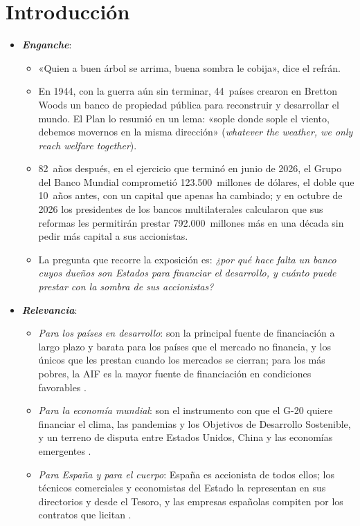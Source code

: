 \documentclass[11pt]{article}
\begin{document}
\tceetitulo

\section*{Introducción}

\begin{itemize}
\item \textbf{\emph{Enganche}}:
  \begin{itemize}
  \item «Quien a buen árbol se arrima, buena sombra le cobija», dice el refrán.
  \item En 1944, con la guerra aún sin terminar, 44~países crearon en Bretton Woods un banco de propiedad pública para reconstruir y desarrollar el mundo. El Plan  lo resumió en un lema: «sople donde sople el viento, debemos movernos en la misma dirección» (\emph{whatever the weather, we only reach welfare together}).
  \item 82~años después, en el ejercicio que terminó en junio de 2026, el Grupo del Banco Mundial comprometió 123.500~millones de dólares, el doble que 10~años antes, con un capital que apenas ha cambiado\nocite{BM2026InformeAnual}; y en octubre de 2026 los presidentes de los bancos multilaterales calcularon que sus reformas les permitirán prestar 792.000~millones más en una década sin pedir más capital a sus accionistas\nocite{BMD2026Declaracion}.
  \item La pregunta que recorre la exposición es: \emph{¿por qué hace falta un banco cuyos dueños son Estados para financiar el desarrollo, y cuánto puede prestar con la sombra de sus accionistas?}
  \end{itemize}

\item \textbf{\emph{Relevancia}}:
  \begin{itemize}
  \item \emph{Para los países en desarrollo}: son la principal fuente de financiación a largo plazo y barata para los países que el mercado no financia, y los únicos que les prestan cuando los mercados se cierran; para los más pobres, la AIF es la mayor fuente de financiación en condiciones favorables .
  \item \emph{Para la economía mundial}: son el instrumento con que el G-20 quiere financiar el clima, las pandemias y los Objetivos de Desarrollo Sostenible, y un terreno de disputa entre Estados Unidos, China y las economías emergentes  .
  \item \emph{Para España y para el cuerpo}: España es accionista de todos ellos; los técnicos comerciales y economistas del Estado la representan en sus directorios y desde el Tesoro, y las empresas españolas compiten por los contratos que licitan  .
  \end{itemize}


\end{itemize}
\end{document}
